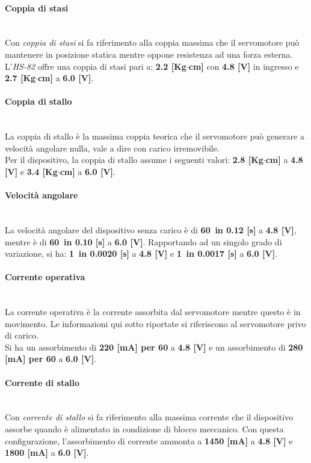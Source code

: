 \documentclass[11pt]{report}
\begin{document}
	\paragraph{Coppia di stasi}\mbox{}\\
	Con \textit{coppia di stasi} si fa riferimento alla coppia massima che il servomotore può mantenere in posizione statica mentre oppone resistenza ad una forza esterna.\\
	L'\textit{HS-82} offre una coppia di stasi pari a: \textbf{2.2 [Kg$\cdot$cm]} con \textbf{4.8 [V]} in ingresso e \textbf{2.7 [Kg$\cdot$cm]} a \textbf{6.0 [V]}.
	
	\paragraph{Coppia di stallo}\mbox{}\\
	La coppia di stallo è la massima coppia teorica che il servomotore può generare a velocità angolare nulla, vale a dire con carico irremovibile.\\
	Per il dispositivo, la coppia di stallo assume i seguenti valori: \textbf{2.8 [Kg$\cdot$cm]} a \textbf{4.8 [V]} e \textbf{3.4 [Kg$\cdot$cm]} a \textbf{6.0 [V]}.
	
	\paragraph{Velocità angolare}\mbox{}\\
	La velocità angolare del dispositivo senza carico è di \textbf{60\degree\, in 0.12 [s]} a \textbf{4.8 [V]}, mentre è di \textbf{60\degree\, in 0.10 [s]} a \textbf{6.0 [V]}.
	Rapportando ad un singolo grado di variazione, si ha: \textbf{1\degree\, in 0.0020 [s]} a \textbf{4.8 [V]} e \textbf{1\degree\, in 0.0017 [s]} a \textbf{6.0 [V]}.
	
	\paragraph{Corrente operativa}\mbox{}\\
	La corrente operativa è la corrente assorbita dal servomotore mentre questo è in movimento. Le informazioni qui sotto riportate si riferiscono al servomotore privo di carico.\\
	Si ha un assorbimento di \textbf{220 [mA] per 60\degree} a \textbf{4.8 [V]} e un assorbimento di \textbf{280 [mA] per 60\degree} a \textbf{6.0 [V]}.
	
	\paragraph{Corrente di stallo}\mbox{}\\
	Con \textit{corrente di stallo} si fa riferimento alla massima corrente che il dispositivo assorbe quando è alimentato in condizione di blocco meccanico.
	Con questa configurazione, l'assorbimento di corrente ammonta a \textbf{1450 [mA]} a \textbf{4.8 [V]} e \textbf{1800 [mA]} a \textbf{6.0 [V]}.
	
\end{document}
